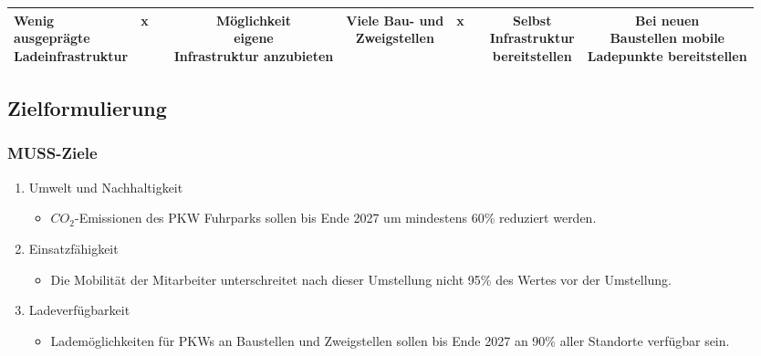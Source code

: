 \documentclass{article}
\begin{document}
\begin{landscape}
\begin{tabular}{| l | c | c | c | c | c | c | c | c |}
		\makecell{Wenig \\ ausgeprägte \\ Ladeinfrastruktur} & \cellcolor{green!25}x & & \makecell{Möglichkeit \\ eigene \\ Infrastruktur anzubieten} & \makecell{Viele Bau- und \\ Zweigstellen} & \cellcolor{green!25}x & & \makecell{Selbst \\ Infrastruktur \\ bereitstellen} & \makecell{Bei neuen \\ Baustellen mobile \\ Ladepunkte bereitstellen} \\ \hline
		\bottomrule
	\end{tabular}
	\end{landscape}
	\subsection{Zielformulierung}
	\subsubsection{MUSS-Ziele}
	\begin{enumerate}
		\item{Umwelt und Nachhaltigkeit}
		\begin{itemize}
			\item{$CO_2$-Emissionen des PKW Fuhrparks sollen bis Ende 2027 um mindestens 60\% reduziert werden.}
		\end{itemize}
		\item{Einsatzfähigkeit}
		\begin{itemize}
			\item{Die Mobilität der Mitarbeiter unterschreitet nach dieser Umstellung nicht 95\% des Wertes vor der Umstellung.}
		\end{itemize}
		\item{Ladeverfügbarkeit}
		\begin{itemize}
			\item{Lademöglichkeiten für PKWs an Baustellen und Zweigstellen sollen bis Ende 2027 an 90\% aller Standorte verfügbar sein.}
		\end{itemize}
	\end{enumerate}
\end{document}
